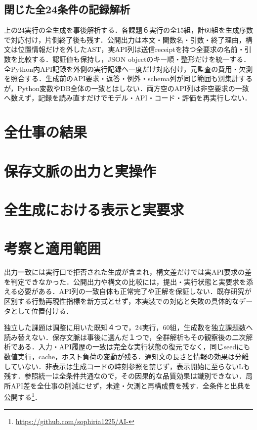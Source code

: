 \documentclass[letter]{ieicej}
\begin{document}
\subsection{閉じた全24条件の記録解析}
上の24実行の全生成を事後解析する．各課題６実行の全15組，計60組を生成序数で対応付け，片側終了後も残す．公開出力は本文・関数名・引数・終了理由，構文は位置情報だけを外したAST，実API列は送信receiptを持つ全要求の名前・引数を比較する．認証値も保持し，JSON objectのキー順・整形だけを統一する．全Python内API記録を外側の実行記録へ一度だけ対応付け，元監査の費用・欠測を照合する．生成前のAPI要求・返答・例外・schema列が同じ範囲も別集計するが，Python変数やDB全体の一致とはしない．両方空のAPI列は非空要求の一致へ数えず，記録を読み直すだけでモデル・API・コード・評価を再実行しない．

\section{全仕事の結果}





\section{保存文脈の出力と実操作}


\section{全生成における表示と実要求}


\section{考察と適用範囲}
出力一致には実行口で拒否された生成が含まれ，構文差だけでは実API要求の差を判定できなかった．公開出力や構文の比較には，提出・実行状態と実要求を添える必要がある．API列の一致自体も正常完了や正解を保証しない．既存研究が区別する行動再現性指標を新方式とせず，本実装での対応と失敗の具体的なデータとして位置付ける．

独立した課題は調整に用いた既知４つで，24実行，60組，生成数を独立課題数へ読み替えない．保存文脈は事後に選んだ１つで，全群解析もその観察後の二次解析である．入力・API履歴の一致は完全な実行状態の復元でなく，同じseedにも数値実行，cache，ホスト負荷の変動が残る．通知文の長さと情報の効果は分離していない．非表示は生成コードの時刻参照を禁じず，表示開始に至らないLも残す．参照統一は全条件共通なので，その因果的な品質効果は識別できない．局所API差を全仕事の削減にせず，未達・欠測と再構成費を残す．全条件と出典を公開する\footnote{\url{https://github.com/sophiria1225/AI-}}．
\end{document}
